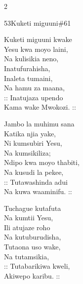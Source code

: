 \begin{multicols}{2}
\begin{hymn}{53}{Kuketi miguuni}{\#61}
\begin{stanza}
Kuketi miguuni kwake\\
Yesu kwa moyo laini,\\
Na kulisikia neno,\\
Inatufurahisha,\\
Inaleta tumaini,\\
Na hamu za maana,\\
:: Inatujaza upendo\\
Kama wake Mwokozi. ::
\end{stanza}
\begin{stanza}
Jambo la muhimu sana\\
Katika njia yake,\\
Ni kumsubiri Yesu,\\
Na kumsikiliza;\\
Ndipo kwa moyo thabiti,\\
Na kusudi la pekee,\\
:: Tutawashinda adui\\
Na kuwa waaminifu. ::
\end{stanza}
\begin{stanza}
Tuchague kutafuta\\
Na kumtii Yesu,\\
Ili atujaze roho\\
Na kutuburudisha,\\
Tutaona uso wake,\\
Na tutamsikia,\\
:: Tutabarikiwa kweli,\\
Akiwepo karibu. ::
\end{stanza}
\end{hymn}


\end{multicols}

